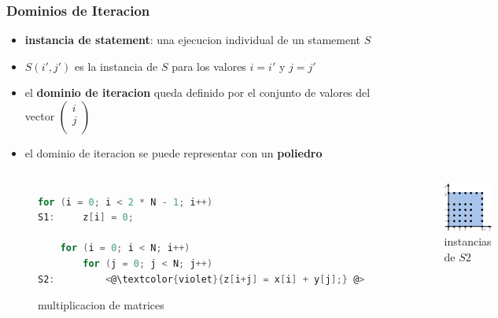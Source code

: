 \documentclass{beamer}\usetheme{Madrid} %
\begin{document}
\begin{frame}[fragile]
\frametitle{Dominios de Iteracion}
\begin{itemize}
\item \textbf{instancia de statement}: una ejecucion individual de un stamement $S$ 
\item $S(i',j')$ es la instancia de $S$ para los valores $i=i'$ y $j=j'$ 
\item el \textbf{dominio de iteracion} queda definido por el conjunto de valores
del vector $\left(\begin{smallmatrix}i\\j\\\end{smallmatrix}\right)$
\item el dominio de iteracion se puede representar con un \textbf{poliedro} 
\end{itemize}
\begin{columns}
\begin{figure}
\begin{lstlisting}[basicstyle=\scriptsize,language=C]
    for (i = 0; i < 2 * N - 1; i++) 
S1:     z[i] = 0;
        
    for (i = 0; i < N; i++) 
        for (j = 0; j < N; j++)
S2:         <@\textcolor{violet}{z[i+j] = x[i] + y[j];} @>
\end{lstlisting}
\caption{multiplicacion de matrices}
\end{figure}
\begin{figure}
\includegraphics[scale=0.4]{img/poly_mul_solo.png}
\caption{instancias de $S2$}
\end{figure}
\end{columns}
\end{frame}
\end{document}
